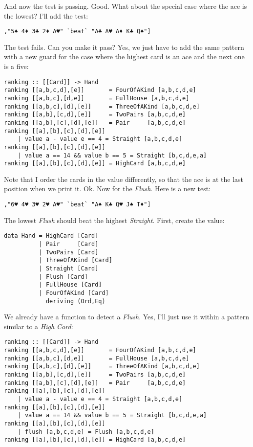 \success And now the test is passing.
\lhN Good. What about the special case where the ace is the lowest? I'll add the test:
\begin{lstlisting}[frame=single]
       ,"5♠ 4♦ 3♣ 2♦ A♥" `beat` "A♣ A♥ A♦ K♣ Q♠"]
\end{lstlisting}
\failure The test fails. Can you make it pass?
\lhA \failure Yes, we just have to add the same pattern with a new guard for the case where the highest card is an ace and the next one is a five:
\begin{lstlisting}[frame=single]
ranking :: [[Card]] -> Hand
ranking [[a,b,c,d],[e]]       = FourOfAKind [a,b,c,d,e]
ranking [[a,b,c],[d,e]]       = FullHouse [a,b,c,d,e]
ranking [[a,b,c],[d],[e]]     = ThreeOfAKind [a,b,c,d,e]
ranking [[a,b],[c,d],[e]]     = TwoPairs [a,b,c,d,e]
ranking [[a,b],[c],[d],[e]]   = Pair     [a,b,c,d,e]
ranking [[a],[b],[c],[d],[e]] 
    | value a - value e == 4 = Straight [a,b,c,d,e] 
ranking [[a],[b],[c],[d],[e]] 
    | value a == 14 && value b == 5 = Straight [b,c,d,e,a] 
ranking [[a],[b],[c],[d],[e]] = HighCard [a,b,c,d,e] 
\end{lstlisting}
\success Note that I order the cards in the value differently, so that the ace is at the last position when we print it.
\lhN Ok. Now for the \emph{Flush}. Here is a new test:
\begin{lstlisting}[frame=single]
       ,"6♥ 4♥ 3♥ 2♥ A♥" `beat` "A♠ K♣ Q♥ J♠ T♦"]
\end{lstlisting}
\failure The lowest \emph{Flush} should beat the highest \emph{Straight}.
\lhA First, create the value:
\begin{lstlisting}[frame=single]
data Hand = HighCard [Card]
          | Pair     [Card]
          | TwoPairs [Card]
          | ThreeOfAKind [Card]
          | Straight [Card]
          | Flush [Card]
          | FullHouse [Card]
          | FourOfAKind [Card]
            deriving (Ord,Eq)
\end{lstlisting}
\lhN We already have a function to detect a \emph{Flush}.
\lhA \failure Yes, I'll just use it within a pattern similar to a \emph{High Card}:
\begin{lstlisting}[frame=single]
ranking :: [[Card]] -> Hand
ranking [[a,b,c,d],[e]]       = FourOfAKind [a,b,c,d,e]
ranking [[a,b,c],[d,e]]       = FullHouse [a,b,c,d,e]
ranking [[a,b,c],[d],[e]]     = ThreeOfAKind [a,b,c,d,e]
ranking [[a,b],[c,d],[e]]     = TwoPairs [a,b,c,d,e]
ranking [[a,b],[c],[d],[e]]   = Pair     [a,b,c,d,e]
ranking [[a],[b],[c],[d],[e]] 
    | value a - value e == 4 = Straight [a,b,c,d,e] 
ranking [[a],[b],[c],[d],[e]] 
    | value a == 14 && value b == 5 = Straight [b,c,d,e,a] 
ranking [[a],[b],[c],[d],[e]] 
    | flush [a,b,c,d,e] = Flush [a,b,c,d,e] 
ranking [[a],[b],[c],[d],[e]] = HighCard [a,b,c,d,e] 
\end{lstlisting}

